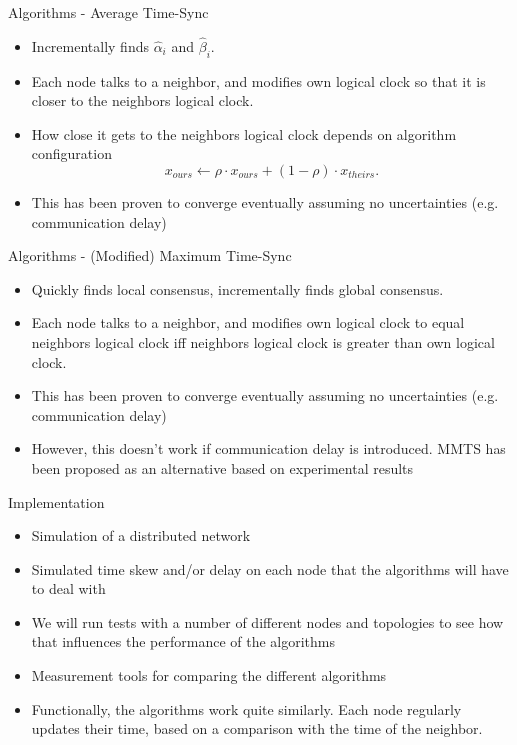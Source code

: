 \documentclass{beamer}
\begin{document}
\begin{frame}{Algorithms - Average Time-Sync}
    \begin{itemize}
        \item Incrementally finds $\hat{\alpha}_i$ and $\hat{\beta}_i$.
        \item Each node talks to a neighbor, and modifies own logical clock so that it is closer to the neighbors logical clock.
        \item How close it gets to the neighbors logical clock depends on algorithm configuration
        $$ x_{ours} \leftarrow \rho \cdot x_{ours} + (1 - \rho) \cdot x_{theirs}. $$
        \item This has been proven to converge eventually assuming no uncertainties (e.g. communication delay) \cite{LucaFiorentin11}
    \end{itemize}
\end{frame}

\begin{frame}{Algorithms - (Modified) Maximum Time-Sync}
    \begin{itemize}
        \item Quickly finds local consensus, incrementally finds global consensus.
        \item Each node talks to a neighbor, and modifies own logical clock to equal neighbors logical clock iff neighbors logical clock is greater than own logical clock.
        \item This has been proven to converge eventually assuming no uncertainties (e.g. communication delay) \cite{HeChengShiChen11}
        \item However, this doesn't work if communication delay is introduced. MMTS has been proposed as an alternative based on experimental results \cite{HeLiChenCheng13}
    \end{itemize}
\end{frame}

\begin{frame}{Implementation}
   \begin{itemize}
       \item Simulation of a distributed network
       \item Simulated time skew and/or delay on each node that the algorithms will have to deal with
       \item We will run tests with a number of different nodes and topologies to see how that influences the performance of the algorithms
       \item Measurement tools for comparing the different algorithms
       \item Functionally, the algorithms work quite similarly. Each node regularly updates their time, based on a comparison with the time of the neighbor.
   \end{itemize} 
\end{frame}
 
\end{document}
